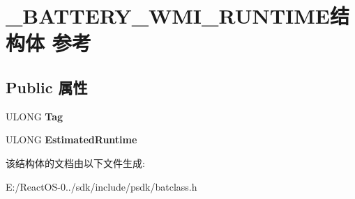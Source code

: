 \hypertarget{struct___b_a_t_t_e_r_y___w_m_i___r_u_n_t_i_m_e}{}\section{\+\_\+\+B\+A\+T\+T\+E\+R\+Y\+\_\+\+W\+M\+I\+\_\+\+R\+U\+N\+T\+I\+M\+E结构体 参考}
\label{struct___b_a_t_t_e_r_y___w_m_i___r_u_n_t_i_m_e}
\subsection*{Public 属性}
\begin{DoxyCompactItemize}
\item 
\mbox{\label{struct___b_a_t_t_e_r_y___w_m_i___r_u_n_t_i_m_e_a78c715b2cde0bd6adc93d81e40a6b076}} 
U\+L\+O\+NG {\bfseries Tag}
\item 
\mbox{\label{struct___b_a_t_t_e_r_y___w_m_i___r_u_n_t_i_m_e_a88329da9c60131ce3795089934fa173d}} 
U\+L\+O\+NG {\bfseries Estimated\+Runtime}
\end{DoxyCompactItemize}


该结构体的文档由以下文件生成\+:\begin{DoxyCompactItemize}
\item 
E\+:/\+React\+O\+S-\/0../sdk/include/psdk/batclass.\+h\end{DoxyCompactItemize}
